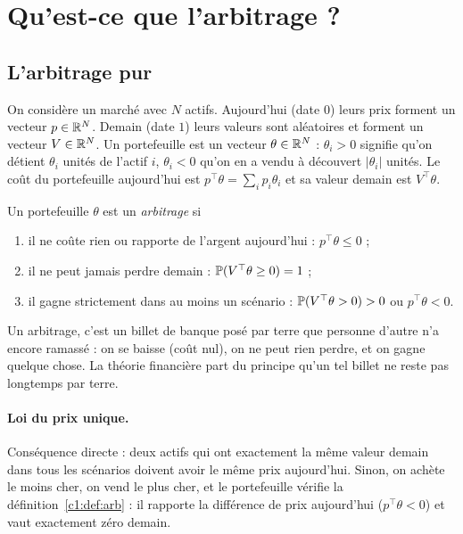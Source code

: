 \section{Qu'est-ce que l'arbitrage ?}\label{c1:sec:arb}

\subsection{L'arbitrage pur}

On considère un marché avec $N$ actifs. Aujourd'hui (date $0$) leurs prix forment un vecteur $p \in \mathbb{R}^N$. Demain (date $1$) leurs valeurs sont aléatoires et forment un vecteur $V \in \mathbb{R}^N$. Un portefeuille est un vecteur $\theta \in \mathbb{R}^N$ : $\theta_i > 0$ signifie qu'on détient $\theta_i$ unités de l'actif $i$, $\theta_i < 0$ qu'on en a vendu à découvert $|\theta_i|$ unités. Le coût du portefeuille aujourd'hui est $p^\top\theta = \sum_i p_i\theta_i$ et sa valeur demain est $V^\top\theta$.

\begin{definition}\label{c1:def:arb}
Un portefeuille $\theta$ est un \emph{arbitrage} si
\begin{enumerate}[label=(\roman*)]
\item il ne coûte rien ou rapporte de l'argent aujourd'hui : $p^\top\theta \le 0$ ;
\item il ne peut jamais perdre demain : $\mathbb{P}(V^\top\theta \ge 0) = 1$ ;
\item il gagne strictement dans au moins un scénario : $\mathbb{P}(V^\top\theta > 0) > 0$ ou $p^\top\theta < 0$.
\end{enumerate}
\end{definition}

\begin{intuition}
Un arbitrage, c'est un billet de banque posé par terre que personne d'autre n'a encore ramassé : on se baisse (coût nul), on ne peut rien perdre, et on gagne quelque chose. La théorie financière part du principe qu'un tel billet ne reste pas longtemps par terre.
\end{intuition}

\paragraph{Loi du prix unique.} Conséquence directe : deux actifs qui ont exactement la même valeur demain dans tous les scénarios doivent avoir le même prix aujourd'hui. Sinon, on achète le moins cher, on vend le plus cher, et le portefeuille vérifie la définition~\ref{c1:def:arb} : il rapporte la différence de prix aujourd'hui ($p^\top\theta<0$) et vaut exactement zéro demain.

